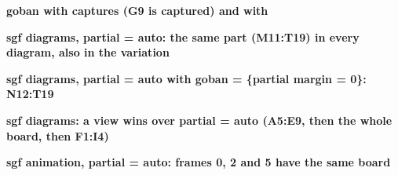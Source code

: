 \documentclass{article}
\newcommand\case[1]{\par\medskip\noindent\textbf{#1}\par\nopagebreak}
\begin{document}

\case{goban with captures (G9 is captured) and with \string\sgf}
\begin{goban}[19, partial = auto, captures]
\end{goban}
\begin{goban}[19, partial = auto]\end{goban}
\begin{goban}[19, partial = auto]\end{goban}

\case{sgf diagrams, partial = auto: the same part (M11:T19) in every diagram, also in the variation}

\case{sgf diagrams, partial = auto with goban = \{partial margin = 0\}: N12:T19}

\case{sgf diagrams: a view wins over partial = auto (A5:E9, then the whole board, then F1:I4)}

\case{sgf animation, partial = auto: frames 0, 2 and 5 have the same board}
\end{document}
